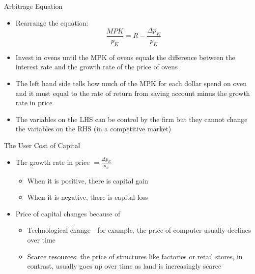 \documentclass[aspectratio=1610]{beamer}
\begin{document}
\begin{frame}[wide]{Arbitrage Equation}
	\begin{itemize}
		\item Rearrange the equation:
		\[\frac{MPK}{p_K} = R-\frac{\Delta p_K}{p_K}\]
		\vspace{2mm}
		\item Invest in ovens until the MPK of ovens equals the difference between the interest rate and the growth rate of the price of ovens
		\vspace{2mm}
		\item The left hand side tells how much of the MPK for each dollar spend on oven and it must equal to the rate of return from saving account minus the growth rate in price
		\vspace{2mm}
		\item The variables on the LHS can be control by the firm but they cannot change the variables on the RHS (in a competitive market)
	\end{itemize}
\end{frame}

\begin{frame}[wide]{The User Cost of Capital}
	\begin{itemize}
		\item The growth rate in price $=\frac{\Delta p_K}{p_K}$
		\vspace{1mm}
		\begin{itemize}
			\item When it is positive, there is capital gain
			\item When it is negative, there is capital loss
		\end{itemize}
		\vspace{3mm}
		\item Price of capital changes because of
		\vspace{1mm}
		\begin{itemize}
			\item Technological change—for example, the price of computer usually declines over time
			\item Scarce resources: the price of structures like factories or retail stores, in contrast, usually goes up over time as land is increasingly scarce
		\end{itemize}
	\end{itemize}
\end{frame}
\end{document}
